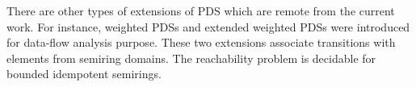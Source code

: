 \documentclass[preprint,12pt]{elsarticle}
\begin{document}


There are other types of extensions of PDS which are remote from the current work. For instance, weighted PDSs and extended weighted PDSs were introduced  \cite{RepsSJM05, LalRB05} for data-flow analysis purpose. These two extensions associate transitions with elements from semiring domains. The reachability problem is decidable for bounded idempotent semirings. 





 



 





\end{document}
